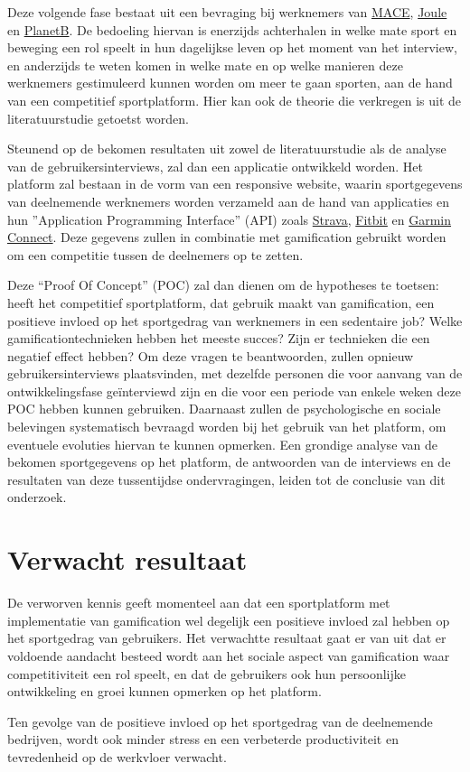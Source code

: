 Deze volgende fase bestaat uit een bevraging bij werknemers van \href{https://www.mace-legal.com/}{MACE}, \href{https://www.joule.be/}{Joule} en \href{https://planetb.life/}{PlanetB}. De bedoeling hiervan is enerzijds achterhalen in welke mate sport en beweging een rol speelt in hun dagelijkse leven op het moment van het interview, en anderzijds te weten komen in welke mate en op welke manieren deze werknemers gestimuleerd kunnen worden om meer te gaan sporten, aan de hand van een competitief sportplatform. Hier kan ook de theorie die verkregen is uit de literatuurstudie getoetst worden.

Steunend op de bekomen resultaten uit zowel de literatuurstudie als de analyse van de gebruikersinterviews, zal dan een applicatie ontwikkeld worden. Het platform zal bestaan in de vorm van een responsive website, waarin sportgegevens van deelnemende werknemers worden verzameld aan de hand van applicaties en hun ''Application Programming Interface'' (API) zoals \href{https://developers.strava.com/}{Strava}, \href{https://dev.fitbit.com/}{Fitbit} en \href{https://developer.garmin.com/gc-developer-program/overview/}{Garmin Connect}. Deze gegevens zullen in combinatie met gamification gebruikt worden om een competitie tussen de deelnemers op te zetten.

Deze ``Proof Of Concept'' (POC) zal dan dienen om de hypotheses te toetsen: heeft het competitief sportplatform, dat gebruik maakt van gamification, een positieve invloed op het sportgedrag van werknemers in een sedentaire job? Welke gamificationtechnieken hebben het meeste succes? Zijn er technieken die een negatief effect hebben? Om deze vragen te beantwoorden, zullen opnieuw gebruikersinterviews plaatsvinden, met dezelfde personen die voor aanvang van de ontwikkelingsfase geïnterviewd zijn en die voor een periode van enkele weken deze POC hebben kunnen gebruiken. Daarnaast zullen de psychologische en sociale belevingen systematisch bevraagd worden bij het gebruik van het platform, om eventuele evoluties hiervan te kunnen opmerken. Een grondige analyse van de bekomen sportgegevens op het platform, de antwoorden van de interviews en de resultaten van deze tussentijdse ondervragingen, leiden tot de conclusie van dit onderzoek.


\section{Verwacht resultaat}%
\label{sec:verwachte_resultaten}

De verworven kennis geeft momenteel aan dat een sportplatform met implementatie van gamification wel degelijk een positieve invloed zal hebben op het sportgedrag van gebruikers. Het verwachtte resultaat gaat er van uit dat er voldoende aandacht besteed wordt aan het sociale aspect van gamification waar competitiviteit een rol speelt, en dat de gebruikers ook hun persoonlijke ontwikkeling en groei kunnen opmerken op het platform.

Ten gevolge van de positieve invloed op het sportgedrag van de deelnemende bedrijven, wordt ook minder stress en een verbeterde productiviteit en tevredenheid op de werkvloer verwacht.